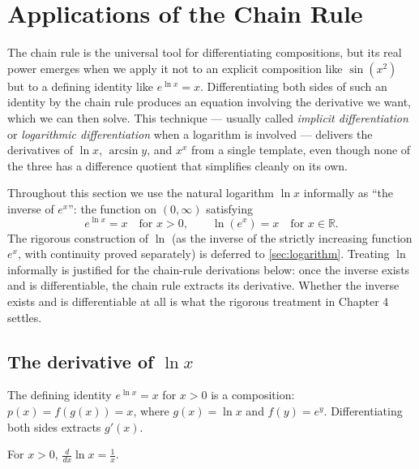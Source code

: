 \section{Applications of the Chain Rule}\label{sec:chain-rule-applications}

The chain rule is the universal tool for differentiating compositions, but its real power emerges when we apply it not to an explicit composition like \(\sin(x^{2})\) but to a defining identity like \(e^{\ln x} = x\). Differentiating both sides of such an identity by the chain rule produces an equation involving the derivative we want, which we can then solve. This technique --- usually called \emph{implicit differentiation} or \emph{logarithmic differentiation} when a logarithm is involved --- delivers the derivatives of \(\ln x\), \(\arcsin y\), and \(x^{x}\) from a single template, even though none of the three has a difference quotient that simplifies cleanly on its own.

\begin{caution}
Throughout this section we use the natural logarithm \(\ln x\) informally as ``the inverse of \(e^{x}\)'': the function on \((0, \infty)\) satisfying
\[
e^{\ln x} = x \quad \text{for } x > 0, \qquad \ln(e^{x}) = x \quad \text{for } x \in \mathbb{R}.
\]
The rigorous construction of \(\ln\) (as the inverse of the strictly increasing function \(e^{x}\), with continuity proved separately) is deferred to \cref{sec:logarithm}. Treating \(\ln\) informally is justified for the chain-rule derivations below: once the inverse exists and is differentiable, the chain rule extracts its derivative. Whether the inverse exists and is differentiable at all is what the rigorous treatment in Chapter 4 settles.
\end{caution}

\subsection{The derivative of \texorpdfstring{$\ln x$}{ln x}}

The defining identity \(e^{\ln x} = x\) for \(x > 0\) is a composition: \(p(x) = f(g(x)) = x\), where \(g(x) = \ln x\) and \(f(y) = e^{y}\). Differentiating both sides extracts \(g'(x)\).

\begin{theorem}\label{thm:derivative-ln}
For \(x > 0\), \(\displaystyle \frac{d}{dx} \ln x = \frac{1}{x}\).
\end{theorem}

